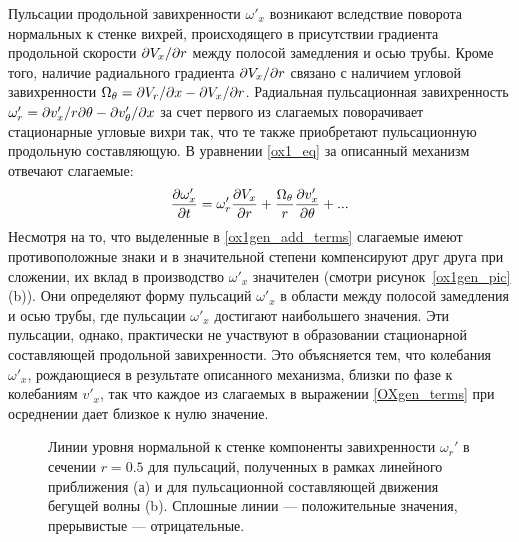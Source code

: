 Пульсации продольной завихренности $\omega'_x$ возникают вследствие поворота нормальных к стенке вихрей, происходящего в присутствии градиента продольной скорости $\partial V_x/ \partial r$ между полосой замедления и осью трубы. Кроме того, наличие радиального градиента $\partial V_x/ \partial r$ связано с наличием угловой завихренности $\Omega_\theta = \partial V_r / \partial x - \partial V_x / \partial r$. Радиальная пульсационная завихренность $\omega'_r = \partial v'_x / r \partial \theta - \partial v'_\theta / \partial x$ за счет первого из слагаемых поворачивает стационарные угловые вихри так, что те также приобретают пульсационную продольную составляющую. В уравнении \eqref{ox1_eq} за описанный механизм отвечают слагаемые:
\begin{equation}\label{ox1gen_add_terms}
\frac{\partial \omega'_x}{\partial t} = \omega'_r \frac {\partial V_x}{\partial r} + \frac{\Omega_\theta}{r} \frac{\partial v'_x}{\partial \theta} + ...
\end{equation}
Несмотря на то, что выделенные в \eqref{ox1gen_add_terms} слагаемые имеют противоположные знаки и в значительной степени компенсируют друг друга при сложении, их вклад в производство $\omega'_x$ значителен (смотри рисунок~\ref{ox1gen_pic}(b)). Они определяют форму пульсаций $\omega'_x$ в области между полосой замедления и осью трубы, где пульсации $\omega'_x$ достигают наибольшего значения. Эти пульсации, однако, практически не участвуют в образовании стационарной составляющей продольной завихренности. Это объясняется тем, что колебания $\omega'_x$, рождающиеся в результате описанного механизма, близки по фазе к колебаниям $v'_x$, так что каждое из слагаемых в выражении \eqref{OXgen_terms} при осреднении дает близкое к нулю значение.

\begin{figure}
\caption{Линии уровня нормальной к стенке компоненты завихренности $\omega_r'$ в сечении $r = 0.5$ для пульсаций, полученных в рамках линейного приближения (а) и для пульсационной составляющей движения бегущей волны (b). Сплошные линии --- положительные значения, прерывистые --- отрицательные.}
\label{pipetw_or1_pic}
\end{figure}

